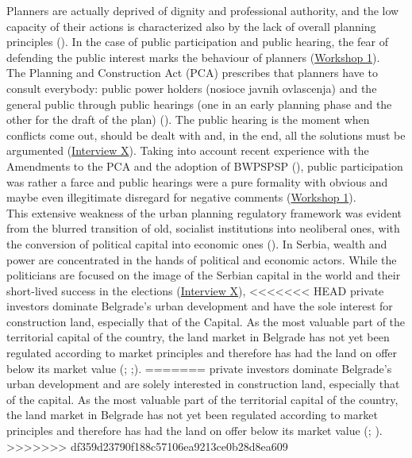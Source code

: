 \documentclass[11pt]{report}
\begin{document}
Planners are  actually deprived of dignity and professional authority, and the low capacity of their actions is characterized also by the lack of overall planning principles (\href{ref}{\citealt{petrovic_cities_2009}}).
In the case of public participation and public hearing, the fear of defending the public interest marks the behaviour of planners (\href{Expert Workshop}{Workshop 1}).
\\

The Planning and Construction Act (PCA) prescribes that planners have to consult everybody: public power holders (nosioce javnih ovlascenja) and the general public through public hearings (one in an early planning phase and the other for the draft of the plan) (\cite{PCA}).
The public hearing is the moment when conflicts come out, should be dealt with and, in the end, all the solutions must be argumented (\href{InterviewX}{Interview X}).
Taking into account recent experience with the Amendments to the PCA and the adoption of BWPSPSP (\cite{ref media all different}), public participation was rather a farce and public hearings were a pure formality with obvious and maybe even illegitimate disregard for negative comments (\href{Expert Workshop}{Workshop 1}).
\\ 

This extensive weakness of the urban planning regulatory framework was evident from the blurred transition of old, socialist institutions into neoliberal ones, with the conversion of political capital into economic ones (\href{ref}{\citealt{vujovic_belgrades_2007}}).
In Serbia, wealth and power are concentrated in the hands of political and economic actors. While the politicians are focused on the image of the Serbian capital in the world and their short-lived success in the elections (\href{InterviewX}{Interview X}),
<<<<<<< HEAD
private investors dominate Belgrade's urban development and have the sole interest for construction land, especially that of the Capital. As the most valuable part of the territorial capital of the country, the land market in Belgrade has not yet been regulated according to market principles and therefore has had the land on offer below its market value (\href{SKGO2013}{\citealt{skgo_finansiranje_2013}}; \href{Zekovic}{\citealt{zekovic_planning_2015}};\href{Zekovic}{\citealt{zekovic_megaprojects_2016}}).
=======
private investors dominate Belgrade’s urban development and are solely interested in construction land, especially that of the capital. As the most valuable part of the territorial capital of the country, the land market in Belgrade has not yet been regulated according to market principles and therefore has had the land on offer below its market value  (\cite{SKGO2013}; \cite{Zekovic all ref}).
>>>>>>> df359d23790f188c57106ea9213ce0b28d8ea609
    
\end{document}
